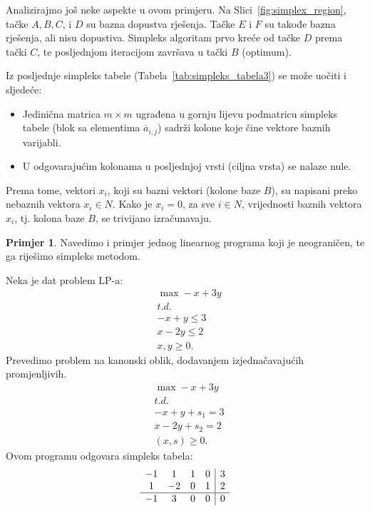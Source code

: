 \documentclass[a4paper, utf8, 11pt, colorlinks]{book}
\theoremstyle{definition}
\newtheorem{primjer}{Primjer}[chapter]
\begin{document}
 Analizirajmo još neke aspekte u ovom primjeru. Na Slici~\ref{fig:simplex_region}, tačke $A, B, C$, i $D$ su bazna dopustva rješenja. Tačke $E$ i $F$ su takođe bazna rješenja, ali nisu dopustiva. Simpleks algoritam prvo kreće od tačke $D$ prema tački $C$, te posljednjom iteracijom završava u tački $B$ (optimum).
 
 
 Iz posljednje simpleks tabele (Tabela~\ref{tab:simpleks_tabela3}) se može uočiti i sljedeće:
 \begin{itemize}
     \item Jedinična matrica $m \times m$   ugrađena u gornju lijevu podmatricu simpleks tabele (blok sa elementima $\overline{a}_{i,j}$) sadrži kolone koje čine vektore baznih varijabli.
     \item U odgovarajućim kolonama u posljednjoj vrsti (ciljna vrsta) se nalaze nule.
 \end{itemize}
 Prema tome, vektori $x_i$, koji su bazni vektori (kolone baze $B$), su napisani preko nebaznih vektora $x_i \in N$. Kako je $x_i  = 0$, za sve $i \in N$, vrijednosti baznih vektora $x_i$, tj. kolona baze $B$, se trivijano izračunavaju.

\begin{primjer} Navedimo i primjer jednog linearnog programa koji je neograničen, te ga riješimo simpleks metodom. 
\end{primjer}
  Neka je dat problem LP-a:
  \begin{align*}
  	  &\max -x + 3y \\
  	  &  {t.d.} \nonumber \\
  	  & -x + y \leq 3 \\
  	  & x - 2y \leq 2 \\
  	  & x,y \geq 0.
  \end{align*}
 Prevedimo problem na kanonski oblik, dodavanjem izjednačavajućih promjenljivih. 
 \begin{align*}
      &\max -x + 3y \\
      &  {t.d.} \nonumber \\
     & -x + y + s_1 = 3 \\
     & x - 2y + s_2 = 2  \\
     & (x,s) \geq 0.
 \end{align*}
Ovom programu odgovara simpleks tabela:
$$\begin{array}{cccc| c} 
	   -1 & 1  & 1 & 0 & 3 \\
	    1 & -2 & 0 & 1 & 2 \\ \hline
	   -1 & 3  & 0 & 0 & 0  
\end{array}$$
 
\end{document}
